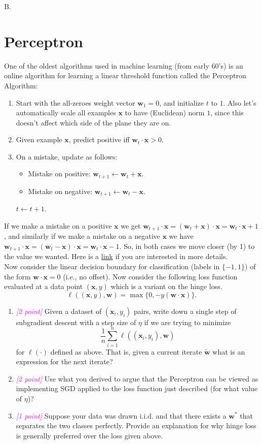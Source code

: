 \documentclass{article}
\newcommand{\1}{\mathbf{1}}
\newcommand{\bx}{\mathbf x}
\newcommand{\bw}{\mathbf w}
\newcommand{\points}[1]{\small\textcolor{magenta}{\emph{[#1 point\ifthenelse{\equal{#1}{1}}{}{s}]}} \normalsize}
\newcounter{bprob}
\newenvironment{bprob}[1][]{\begin{mdframed} \refstepcounter{bprob}\par\medskip
  B\thebprob.#1 }
   { \end{mdframed} }
\begin{document}
\begin{bprob}
\section*{Perceptron}
One of the oldest algorithms used in machine learning (from early 60's) is an online algorithm for learning a linear threshold function called the Perceptron Algorithm:

\begin{enumerate}[label=\arabic*.]
\item Start with the all-zeroes weight vector $\bw_1 = 0$, and initialize $t$ to $1$. Also let's automatically scale all examples $\bx$ to have (Euclidean) norm $1$, since this doesn't affect which side of the plane they are on.

\item Given example $\bx$, predict positive iff $\bw_t \cdot \bx > 0$.

\item On a mistake, update as follows:
\begin{itemize}
    \item Mistake on positive: $\bw_{t+1} \leftarrow \bw_t + \bx$. 
    \item Mistake on negative: $\bw_{t+1} \leftarrow \bw_t - \bx$.
\end{itemize}
    $t \leftarrow t + 1$.
\end{enumerate}
If we make a mistake on a positive $\bx$ we get $\bw_{t + 1} \cdot \bx = (\bw_{t} + \bx) \cdot \bx = \bw_{t} \cdot \bx + 1$, and similarly if we make a mistake on a negative $\bx$ we have $\bw_{t + 1} \cdot \bx = (\bw_{t} - \bx) \cdot \bx = \bw_{t} \cdot \bx - 1$. So, in both cases we move closer (by 1) to the value we wanted. Here is a \href{https://en.wikipedia.org/wiki/Perceptron}{link} if you are interested in more details.\\

Now consider the linear decision boundary for classification (labels in $\{-1,1\}$) of the form
$\bw\cdot \bx = 0$ (i.e., no offset).
Now consider the following loss function evaluated at a data point $(\bx, y)$ which is a variant on the hinge loss.
\[
    \ell((\bx,y), \bw)  = \max \{ 0, -y (\bw\cdot \bx)\}.
\]
\begin{enumerate}
\item \points{2} Given a dataset of $(\bx_i,y_i)$ pairs, write down a single step of subgradient descent with a step size of $\eta$ if we are trying to minimize
\[
    \frac{1}{n}\sum_{i=1}^n \ell((\bx_i,y_i), \bw)
\]
for $\ell(\cdot)$ defined as above. That is, given a current iterate $\widetilde{\bw}$ what is an expression for the next iterate?  
\item \points{2} Use what you derived to argue that the Perceptron can be viewed as implementing SGD applied to the loss function just described (for what value of $\eta$)?
\item \points{1} Suppose your data was drawn i.i.d. and that there exists a $\bw^*$ that separates the two classes perfectly. Provide an explanation for why hinge loss is generally preferred over the loss given above. 
\end{enumerate}


\end{bprob}
\end{document}
